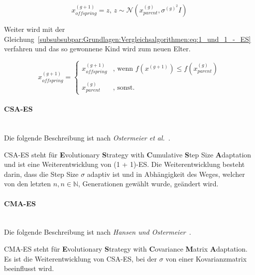\documentclass[fontsize=12, a4aper]{scrartcl}
\begin{document}
	\begin{equation} \label{subsubsubpar:Grundlagen:Vergleichsalgorithmen:1_und_1_-_ES:eq:Offspring}
		x^{(g + 1)}_{offspring} = z, \, z \sim \mathcal{N}(x^{(g)}_{parent}, \sigma^{(g)^2}I)
	\end{equation}
	
	 Weiter wird mit der Gleichung~\ref{subsubsubpar:Grundlagen:Vergleichsalgorithmen:eq:1_und_1_-_ES} verfahren und das so gewonnene Kind wird zum neuen Elter.
	
	\begin{equation} \label{subsubsubpar:Grundlagen:Vergleichsalgorithmen:eq:1_und_1_-_ES}
		x^{(g + 1)}_{offspring} =
			\begin{cases}
				x^{(g + 1)}_{offspring} &\text{, wenn } f(x^{(g + 1)}) \leq f(x^{(g)}_{parent})\\
				\\
				x^{(g)}_{parent} 		&\text{, sonst.}
			\end{cases}
	\end{equation}
	
	\paragraph{CSA-ES}\mbox{}\\
	
	Die folgende Beschreibung ist nach \textit{Ostermeier et al.}~\cite{ostermeier1994step}.\hfill\newline
	
	CSA-ES steht für \textbf{E}volutionary \textbf{S}trategy with \textbf{C}umulative \textbf{S}tep Size \textbf{A}daptation und ist eine Weiterentwicklung von (1 + 1)-ES. Die Weiterentwicklung besteht darin, dass die Step Size \(\sigma\) adaptiv ist und in Abhängigkeit des Weges, welcher von den letzten \(n, n \in \mathbb{N}\), Generationen gewählt wurde, geändert wird.
	
	\paragraph{CMA-ES}\mbox{}\\
	
	Die folgende Beschreibung ist nach \textit{Hansen und Ostermeier}~\cite{hansen2001completely}.\hfill\newline
	
	CMA-ES steht für \textbf{E}volutionary \textbf{S}trategy with \textbf{C}ovariance \textbf{M}atrix \textbf{A}daptation. Es ist die Weiterentwicklung von CSA-ES, bei der \(\sigma\) von einer Kovarianzmatrix beeinflusst wird.
	
\end{document}
